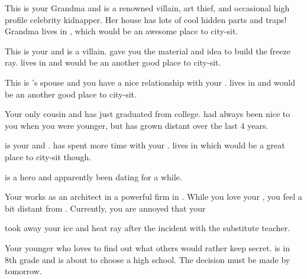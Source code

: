 \documentclass[char]{LRSguildcamp1}
\begin{document}
\begin{itemz}[Notes]
	\item 
\end{itemz}
\begin{contacts}
	\contact{\cGrandma{}} This is your Grandma and is a renowned villain, art thief, and occasional high profile celebrity kidnapper. Her house has lots of cool hidden parts and traps! Grandma lives in \pCityGrandma{}, which would be an awesome place to city-sit. 
	
	\contact{\cOldest{}} This is your  \cOldest{\uncle} and is a villain.  gave you the material and idea to build the freeze ray. \cOldest{} lives in \pCityO{} and would be an another good place to city-sit.
	
	\contact{\cOS{}} This is \cOldest{}'s spouse and you have a nice relationship with your \cOS{\them}.\cOS{} lives in \pCityO{} and would be an another good place to city-sit.
	
	\contact{\cGrad{}} Your only cousin  and has just graduated from college. \cGrad{} had always been nice to you when you were younger, but has grown distant over the last 4 years.  
	
	\contact{\cYoungest{}} \cYoungest{} is your \cYoungest{\uncle} and \cYoungest{\hero}. \cTween{} has spent more time with your \cYoungest{\uncle}. \cYoungest{} lives in \pCityYoungest{} which would be a great place to city-sit though.
 
	\contact{\cYS{}} \cYS{} is a hero and apparently been dating \cYoungest{} for a while. 
	
	\contact{\cArchitect{}} Your \cArchitect{\parent} works as an architect in a powerful firm in \pCityArchitect{}.  While you love your \cArchitect{\parent}, you feel a bit distant from \cArchitect{\them}. Currently, you are annoyed that your 
	
	\cArchitect{\parent} took away your ice and heat ray after the incident with the substitute teacher. 
	
	 	\contact{\cTween{}} Your younger \cTween{\sibling} who loves to find out what others would rather keep secret. \cTween{} is in 8th grade and is about to choose a high school. The decision must be made by tomorrow. 
		
\end{contacts}
\end{document}
